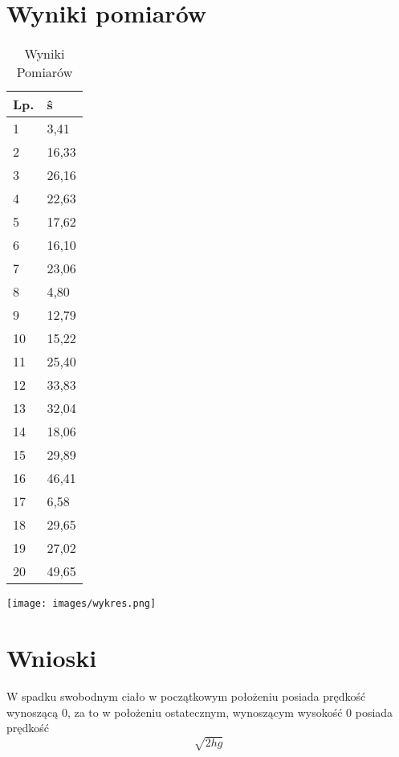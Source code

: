 \documentclass{article}
\begin{document}
\section{Wyniki pomiarów}
\begin{table}[h]
\centering
\begin{tabular}{|l|l|}
\hline
Lp. & ŝ     \\ \hline
1   & 3,41  \\ \hline
2   & 16,33 \\ \hline
3   & 26,16 \\ \hline
4   & 22,63 \\ \hline
5   & 17,62 \\ \hline
6   & 16,10 \\ \hline
7   & 23,06 \\ \hline
8   & 4,80  \\ \hline
9   & 12,79 \\ \hline
10  & 15,22 \\ \hline
11  & 25,40 \\ \hline
12  & 33,83 \\ \hline
13  & 32,04 \\ \hline
14  & 18,06 \\ \hline
15  & 29,89 \\ \hline
16  & 46,41 \\ \hline
17  & 6,58  \\ \hline
18  & 29,65 \\ \hline
19  & 27,02 \\ \hline
20  & 49,65 \\ \hline
\end{tabular}
\caption{Wyniki Pomiarów}
\end{table}

\texttt{[image: images/wykres.png]}
\caption{Wykres zależności drogi od czasu}
\centering

\raggedright
\section{Wnioski}
W spadku swobodnym ciało w początkowym położeniu posiada prędkość wynoszącą 0, za to w położeniu ostatecznym, wynoszącym wysokość 0 posiada prędkość $$\sqrt{2hg}$$
    
\end{document}
